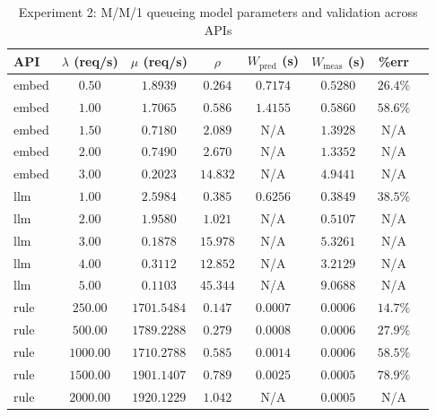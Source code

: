 \begin{table}[htbp]
\centering
\caption{Experiment 2: M/M/1 queueing model parameters and validation across APIs}
\label{tab:medium_mm1-metrics}
\begin{tabular}{lccccccc}
\toprule
API & $\lambda$ (req/s) & $\mu$ (req/s) & $\rho$ & $W_{\text{pred}}$ (s) & $W_{\text{meas}}$ (s) & \%err \\
\midrule
embed & $0.50$ & $1.8939$ & $0.264$ & $0.7174$ & $0.5280$ & $26.4\%$ \\
embed & $1.00$ & $1.7065$ & $0.586$ & $1.4155$ & $0.5860$ & $58.6\%$ \\
embed & $1.50$ & $0.7180$ & $2.089$ & N/A & $1.3928$ & N/A \\
embed & $2.00$ & $0.7490$ & $2.670$ & N/A & $1.3352$ & N/A \\
embed & $3.00$ & $0.2023$ & $14.832$ & N/A & $4.9441$ & N/A \\
llm & $1.00$ & $2.5984$ & $0.385$ & $0.6256$ & $0.3849$ & $38.5\%$ \\
llm & $2.00$ & $1.9580$ & $1.021$ & N/A & $0.5107$ & N/A \\
llm & $3.00$ & $0.1878$ & $15.978$ & N/A & $5.3261$ & N/A \\
llm & $4.00$ & $0.3112$ & $12.852$ & N/A & $3.2129$ & N/A \\
llm & $5.00$ & $0.1103$ & $45.344$ & N/A & $9.0688$ & N/A \\
rule & $250.00$ & $1701.5484$ & $0.147$ & $0.0007$ & $0.0006$ & $14.7\%$ \\
rule & $500.00$ & $1789.2288$ & $0.279$ & $0.0008$ & $0.0006$ & $27.9\%$ \\
rule & $1000.00$ & $1710.2788$ & $0.585$ & $0.0014$ & $0.0006$ & $58.5\%$ \\
rule & $1500.00$ & $1901.1407$ & $0.789$ & $0.0025$ & $0.0005$ & $78.9\%$ \\
rule & $2000.00$ & $1920.1229$ & $1.042$ & N/A & $0.0005$ & N/A \\
\bottomrule
\end{tabular}
\end{table}
